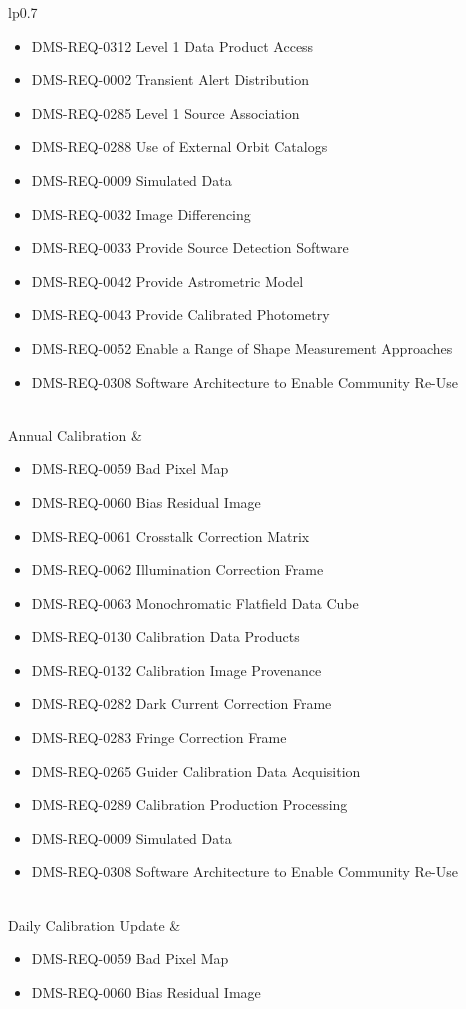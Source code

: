 \begin{xtabular}{lp{0.7\textwidth}}
\begin{itemize}
\item DMS-REQ-0312 Level 1 Data Product Access
\item DMS-REQ-0002 Transient Alert Distribution
\item DMS-REQ-0285 Level 1 Source Association
\item DMS-REQ-0288 Use of External Orbit Catalogs
\item DMS-REQ-0009 Simulated Data
\item DMS-REQ-0032 Image Differencing
\item DMS-REQ-0033 Provide Source Detection Software
\item DMS-REQ-0042 Provide Astrometric Model
\item DMS-REQ-0043 Provide Calibrated Photometry
\item DMS-REQ-0052 Enable a Range of Shape Measurement Approaches
\item DMS-REQ-0308 Software Architecture to Enable Community Re-Use
\end{itemize} \\ \hline
Annual Calibration &
\begin{itemize}
\item DMS-REQ-0059 Bad Pixel Map
\item DMS-REQ-0060 Bias Residual Image
\item DMS-REQ-0061 Crosstalk Correction Matrix
\item DMS-REQ-0062 Illumination Correction Frame
\item DMS-REQ-0063 Monochromatic Flatfield Data Cube
\item DMS-REQ-0130 Calibration Data Products
\item DMS-REQ-0132 Calibration Image Provenance
\item DMS-REQ-0282 Dark Current Correction Frame
\item DMS-REQ-0283 Fringe Correction Frame
\item DMS-REQ-0265 Guider Calibration Data Acquisition
\item DMS-REQ-0289 Calibration Production Processing
\item DMS-REQ-0009 Simulated Data
\item DMS-REQ-0308 Software Architecture to Enable Community Re-Use
\end{itemize} \\ \hline
Daily Calibration Update &
\begin{itemize}
\item DMS-REQ-0059 Bad Pixel Map
\item DMS-REQ-0060 Bias Residual Image

\end{itemize}
\end{xtabular}
